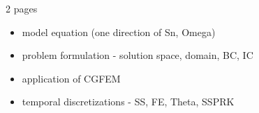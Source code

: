 2 pages
\begin{itemize}
\item model equation (one direction of Sn, Omega)
\item problem formulation - solution space, domain, BC, IC
\item application of CGFEM
\item temporal discretizations - SS, FE, Theta, SSPRK
\end{itemize}
